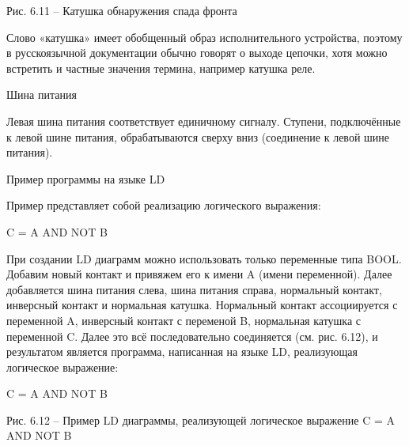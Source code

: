\documentclass[letterpaper,10pt,russian]{sphinxmanual}
\begin{document}

Рис. 6.11 – Катушка обнаружения спада фронта

Слово «катушка» имеет обобщенный образ исполнительного устройства,
поэтому в русскоязычной документации обычно говорят о выходе цепочки,
хотя можно встретить и частные значения термина, например катушка реле.

Шина питания

Левая шина питания соответствует единичному сигналу. Ступени,
подключённые к левой шине питания, обрабатываются сверху вниз
(соединение к левой шине питания).

Пример программы на языке LD

Пример представляет собой реализацию логического выражения:

C = A AND NOT B

При создании LD диаграмм можно использовать только переменные типа BOOL.
Добавим новый контакт и привяжем его к имени A (имени переменной). Далее
добавляется шина питания слева, шина питания справа, нормальный контакт,
инверсный контакт и нормальная катушка. Нормальный контакт ассоциируется
с переменной A, инверсный контакт с переменой B, нормальная катушка с
переменной C. Далее это всё последовательно соединяется (см. рис. 6.12),
и результатом является программа, написанная на языке LD, реализующая
логическое выражение:

C = A AND NOT B


Рис. 6.12 – Пример LD диаграммы, реализующей логическое выражение C = A
AND NOT B
\end{document}
